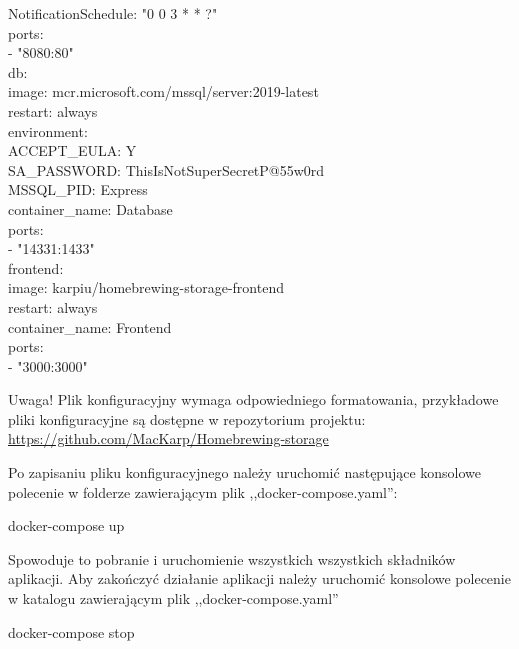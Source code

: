 \documentclass[12pt,a4paper]{article}
\begin{document}
\begin{tcolorbox}[minipage,colback=white,arc=0pt,outer arc=0pt, fontupper=\scriptsize]
\begin{tabbing}
            			\>\>\> NotificationSchedule: "0 0 3 * * ?" \\
        				\>\> ports: \\
            			\>\>\> - "8080:80" \\
    					\> db: \\
						\>\> image: mcr.microsoft.com/mssql/server:2019-latest \\
        				\>\> restart: always \\
        				\>\> environment: \\
            			\>\>\> ACCEPT\_EULA: Y \\
            			\>\>\> SA\_PASSWORD: ThisIsNotSuperSecretP@55w0rd \\
            			\>\>\> MSSQL\_PID: Express \\
        				\>\> container\_name: Database \\
        				\>\> ports: \\
						\>\>\> - "14331:1433" \\
						\> frontend: \\
        				\>\> image: karpiu/homebrewing-storage-frontend \\
        				\>\> restart: always \\
        				\>\> container\_name: Frontend \\
        				\>\> ports: \\
            			\>\>\> - "3000:3000"
					\end{tabbing}
				\end{tcolorbox}	
				\begin{tcolorbox}[minipage,colback=white,arc=0pt,outer arc=0pt, fontupper=\scriptsize]
					Uwaga! Plik konfiguracyjny wymaga odpowiedniego formatowania, przykładowe pliki konfiguracyjne są dostępne w repozytorium projektu:
					\url{https://github.com/MacKarp/Homebrewing-storage}
				\end{tcolorbox}
				Po zapisaniu pliku konfiguracyjnego należy uruchomić następujące konsolowe polecenie w folderze zawierającym plik ,,docker-compose.yaml'':
				\begin{tcolorbox}[minipage,colback=white,arc=0pt,outer arc=0pt, fontupper=\scriptsize]
					docker-compose up
				\end{tcolorbox}
				Spowoduje to pobranie i uruchomienie wszystkich wszystkich składników aplikacji. Aby zakończyć działanie aplikacji należy uruchomić konsolowe
				polecenie w katalogu zawierającym plik ,,docker-compose.yaml''  	
				\begin{tcolorbox}[minipage,colback=white,arc=0pt,outer arc=0pt, fontupper=\scriptsize]
					docker-compose stop			
				\end{tcolorbox}
\end{document}
